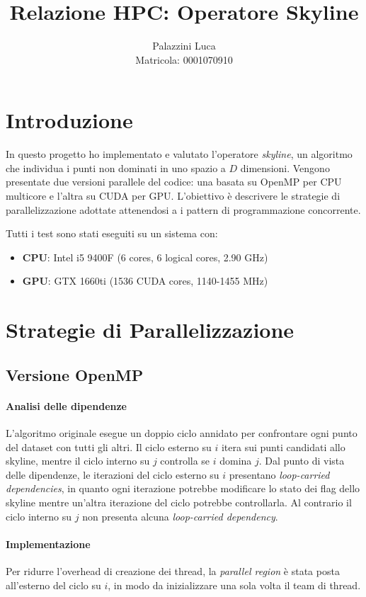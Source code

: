 \documentclass[a4paper,12pt,oneside]{article}
\title{\textbf{Relazione HPC: Operatore Skyline}}
\author{Palazzini Luca\\Matricola: 0001070910}
\begin{document}
\maketitle

\section{Introduzione}
In questo progetto ho implementato e valutato l'operatore \emph{skyline}, un algoritmo che individua i punti non dominati in uno spazio a $D$ dimensioni. Vengono presentate due versioni parallele del codice: una basata su OpenMP per CPU multicore e l'altra su CUDA per GPU. L'obiettivo è descrivere le strategie di parallelizzazione adottate attenendosi a i pattern di programmazione concorrente.

Tutti i test sono stati eseguiti su un sistema con:
\begin{itemize}
    \item \textbf{CPU}: Intel i5 9400F (6 cores, 6 logical cores, 2.90 GHz)
    \item \textbf{GPU}: GTX 1660ti (1536 CUDA cores, 1140-1455 MHz)
\end{itemize}

\section{Strategie di Parallelizzazione}
\subsection{Versione OpenMP}

\paragraph{Analisi delle dipendenze}
L’algoritmo originale esegue un doppio ciclo annidato per confrontare ogni punto del dataset con tutti gli altri. Il ciclo esterno su $i$ itera sui punti candidati allo skyline, mentre il ciclo interno su $j$ controlla se $i$ domina $j$.
Dal punto di vista delle dipendenze, le iterazioni del ciclo esterno su $i$ presentano \textit{loop-carried dependencies}, in quanto ogni iterazione potrebbe modificare lo stato dei flag dello skyline mentre un'altra iterazione del ciclo potrebbe controllarla. Al contrario il ciclo interno su $j$ non presenta alcuna \textit{loop-carried dependency}.

\paragraph{Implementazione}
Per ridurre l’overhead di creazione dei thread, la \textit{parallel region} è stata posta all’esterno del ciclo su $i$, in modo da inizializzare una sola volta il team di thread.
\end{document}
